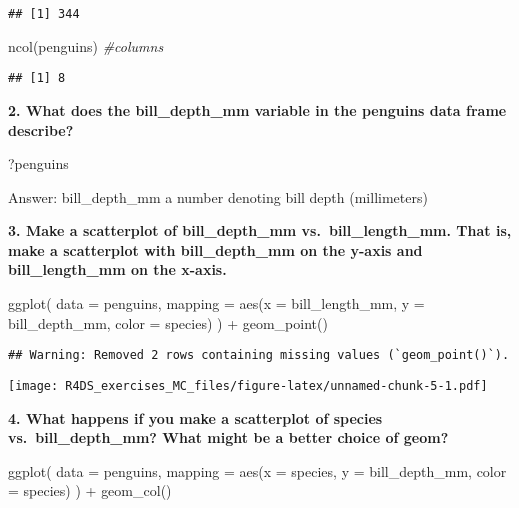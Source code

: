 \documentclass[
]{article}
\newenvironment{Shaded}{\begin{snugshade}}{\end{snugshade}}
\newcommand{\AttributeTok}[1]{\textcolor[rgb]{0.77,0.63,0.00}{#1}}
\newcommand{\CommentTok}[1]{\textcolor[rgb]{0.56,0.35,0.01}{\textit{#1}}}
\newcommand{\FunctionTok}[1]{\textcolor[rgb]{0.00,0.00,0.00}{#1}}
\newcommand{\NormalTok}[1]{#1}
\newcommand{\SpecialCharTok}[1]{\textcolor[rgb]{0.00,0.00,0.00}{#1}}
\begin{document}
\begin{verbatim}
## [1] 344
\end{verbatim}

\begin{Shaded}
\begin{Highlighting}[]
\FunctionTok{ncol}\NormalTok{(penguins) }\CommentTok{\#columns}
\end{Highlighting}
\end{Shaded}

\begin{verbatim}
## [1] 8
\end{verbatim}

\textbf{2. What does the bill\_depth\_mm variable in the penguins data
frame describe?}

\begin{Shaded}
\begin{Highlighting}[]
\NormalTok{?penguins}
\end{Highlighting}
\end{Shaded}

Answer: bill\_depth\_mm a number denoting bill depth (millimeters)

\textbf{3. Make a scatterplot of bill\_depth\_mm vs.~bill\_length\_mm.
That is, make a scatterplot with bill\_depth\_mm on the y-axis and
bill\_length\_mm on the x-axis.}

\begin{Shaded}
\begin{Highlighting}[]
\FunctionTok{ggplot}\NormalTok{(}
  \AttributeTok{data =}\NormalTok{ penguins,}
  \AttributeTok{mapping =} \FunctionTok{aes}\NormalTok{(}\AttributeTok{x =}\NormalTok{ bill\_length\_mm, }\AttributeTok{y =}\NormalTok{ bill\_depth\_mm, }\AttributeTok{color =}\NormalTok{ species)}
\NormalTok{) }\SpecialCharTok{+}
  \FunctionTok{geom\_point}\NormalTok{()}
\end{Highlighting}
\end{Shaded}

\begin{verbatim}
## Warning: Removed 2 rows containing missing values (`geom_point()`).
\end{verbatim}

\texttt{[image: R4DS\_exercises\_MC\_files/figure-latex/unnamed-chunk-5-1.pdf]}

\textbf{4. What happens if you make a scatterplot of species
vs.~bill\_depth\_mm? What might be a better choice of geom?}

\begin{Shaded}
\begin{Highlighting}[]
\FunctionTok{ggplot}\NormalTok{(}
  \AttributeTok{data =}\NormalTok{ penguins,}
  \AttributeTok{mapping =} \FunctionTok{aes}\NormalTok{(}\AttributeTok{x =}\NormalTok{ species, }\AttributeTok{y =}\NormalTok{ bill\_depth\_mm, }\AttributeTok{color =}\NormalTok{ species)}
\NormalTok{) }\SpecialCharTok{+}
  \FunctionTok{geom\_col}\NormalTok{()}
\end{Highlighting}
\end{Shaded}
\end{document}

